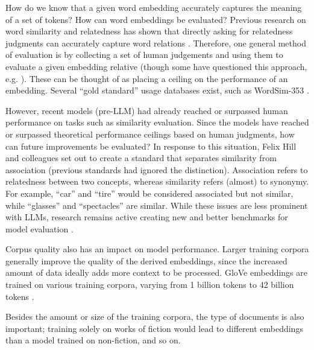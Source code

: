 
How do we know that a given word embedding accurately captures the meaning of a set of tokens? How can word embeddings be evaluated? Previous research on word similarity and relatedness has shown that directly asking for relatedness judgments can accurately capture word relations \cite{finkelstein2001placing}. Therefore, one general method of evaluation is by collecting a set of human judgements and using them to evaluate a given embedding relative (though some have questioned this approach, e.g. \cite{richie2022inter}). These can be thought of as placing a ceiling on the performance of an embedding. Several ``gold standard'' usage databases exist, such as WordSim-353 \cite{finkelstein2001placing, agirre2009study}. 

However, recent models (pre-LLM) had already reached or surpassed human performance on tasks such as similarity evaluation. Since the models have reached or surpassed theoretical performance ceilings based on human judgments, how can future improvements be evaluated? In response to this situation, Felix Hill and colleagues \cite{hill2015simlex} set out to create a standard that separates similarity from association (previous standards had ignored the distinction). Association refers to relatedness between two concepts, whereas similarity refers (almost) to synonymy. For example, ``car'' and ``tire'' would be considered associated but not similar, while ``glasses'' and ``spectacles'' are similar. While these issues are less prominent with LLMs, research remains active creating new and better benchmarks for model evaluation \cite{bugliarello2023measuring}.

Corpus quality also has an impact on model performance. Larger training corpora generally improve the quality of the derived embeddings, since the increased amount of data ideally adds more context to be processed. GloVe embeddings are trained on various training corpora, varying from 1 billion tokens to 42 billion tokens \cite{pennington2014glove}.

Besides the amount or size of the training corpora, the type of documents is also important; training solely on works of fiction would lead to different embeddings than a model trained on non-fiction, and so on.

